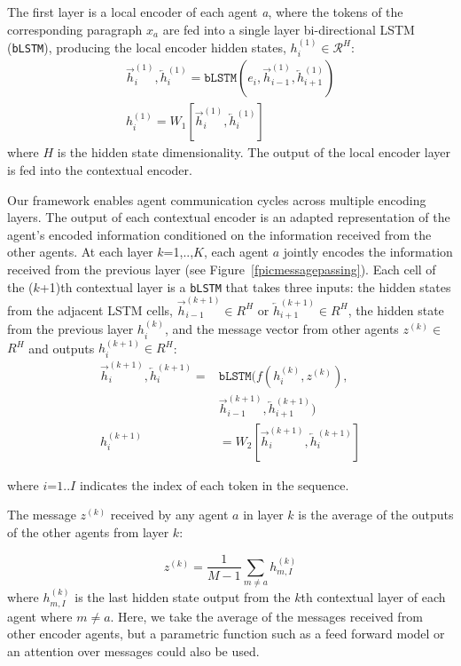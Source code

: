 \documentclass[11pt,a4paper]{article}
\begin{document}
 The first layer is a local encoder of each agent \textit{a}, where 
the tokens of the corresponding paragraph $x_a$ are fed into a single layer bi-directional LSTM (\texttt{bLSTM}), producing the local encoder hidden states, $h_{i}^{(1)} \in \mathcal{R}^{H}$: \begin{align}
\overrightarrow{h}_{i}^{(1)},\overleftarrow{h}_{i}^{(1)} = \texttt{bLSTM}(e_{i},\overrightarrow{h}_{i-1}^{(1)},\overleftarrow{h}_{{i}+1}^{(1)})\\
h_{i}^{(1)}= W_1[\overrightarrow{h}_{i}^{(1)},\overleftarrow{h}_{i}^{(1)}] \end{align}
where $H$ is the hidden state dimensionality. 
The output of the local encoder layer is fed into the contextual encoder. 

Our framework enables agent communication cycles across multiple encoding layers. 
The output of each contextual encoder is an adapted representation of the agent's encoded information conditioned on the information received from the other agents.
At each layer $k$=1,..,$K$, each agent $a$ jointly encodes the information received from the previous layer (see Figure~\ref{fpicmessagepassing}). 
Each cell of the ($k$+1)th contextual layer is a \texttt{bLSTM} that takes three inputs: the hidden states from the adjacent LSTM cells, $\overrightarrow{h}_{i-1}^{(k+1)}$$\in$$R^{H}$ or $\overleftarrow{h}_{i+1}^{(k+1)}$$\in$$R^{H}$, the hidden state from the previous layer $h_{i}^{(k)}$, and the message vector from other agents $z^{(k)}$$\in$$R^{H}$ and outputs $h_{i}^{(k+1)}$$\in$$R^{H}$:
\begin{align}
\overrightarrow{h}_{i}^{(k+1)},\overleftarrow{h}_{i}^{(k+1)} = &\texttt{bLSTM}(f(h_{i}^{(k)}, z^{(k)}), \\
&\overrightarrow{h}_{i-1}^{(k+1)},\overleftarrow{h}_{{i}+1}^{(k+1)})\\
h_{i}^{(k+1)}&= W_2 [\overrightarrow{h}_{i}^{(k+1)},\overleftarrow{h}_{i}^{(k+1)}] \label{eq:ctx_output}
\end{align}


\noindent where $i$=$1..I$ indicates the index of each token in the sequence. 

The message $z^{(k)}$ received by any agent $a$ in layer $k$ is the average of the outputs of the other agents from layer $k$:


\begin{equation}
z^{(k)}=\textstyle{\frac{1}{M-1}\sum_{m\neq a}} h_{m,I}^{(k)}
\label{fmessage}
\end{equation}
where $h_{m,I}^{(k)}$ is the last hidden state output from the $k$th contextual layer of each agent where $m \neq a$. Here, we take the average of the messages received from other encoder agents, but a parametric function such as a feed forward model or an attention over messages could also be used. 
\end{document}
